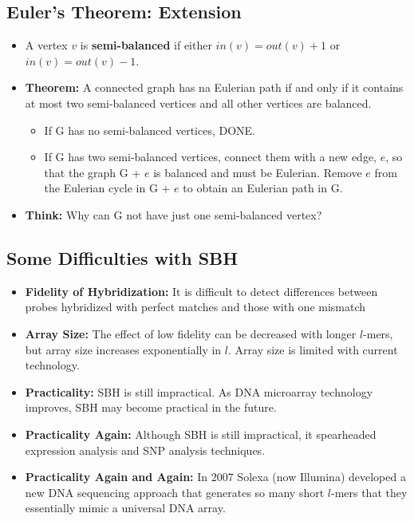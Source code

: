 \documentclass[10pt]{article}
\begin{document}
\subsection*{Euler's Theorem: Extension}
\begin{itemize}
    \item A vertex $v$ is \textbf{semi-balanced} if either $in(v) = out(v) + 1$ or $in(v) = out(v) - 1$.
    \item \textbf{Theorem:} A connected graph has na Eulerian path if and only if it contains at most two semi-balanced vertices and all other vertices are balanced.
    \begin{itemize}
        \item If G has no semi-balanced vertices, DONE.
        \item If G has two semi-balanced vertices, connect them with a new edge, $e$, so that the graph G + $e$ is balanced and must be Eulerian.  Remove $e$ from the Eulerian cycle in G + $e$ to obtain an Eulerian path in G.
    \end{itemize}
    \item \textbf{Think:} Why can G not have just one semi-balanced vertex?
\end{itemize}

\subsection*{Some Difficulties with SBH}
\begin{itemize}
    \item \textbf{Fidelity of Hybridization:} It is difficult to detect differences between probes hybridized with perfect matches and those with one mismatch
    \item \textbf{Array Size:} The effect of low fidelity can be decreased with longer $l$-mers, but array size increases exponentially in $l$.  Array size is limited with current technology.
    \item \textbf{Practicality:} SBH is still impractical.  As DNA microarray technology improves, SBH may become practical in the future.
    \item \textbf{Practicality Again:} Although SBH is still impractical, it spearheaded expression analysis and SNP analysis techniques.
    \item \textbf{Practicality Again and Again:} In 2007 Solexa (now Illumina) developed a new DNA sequencing approach that generates so many short $l$-mers that they essentially mimic a universal DNA array.
\end{itemize}
\end{document}
